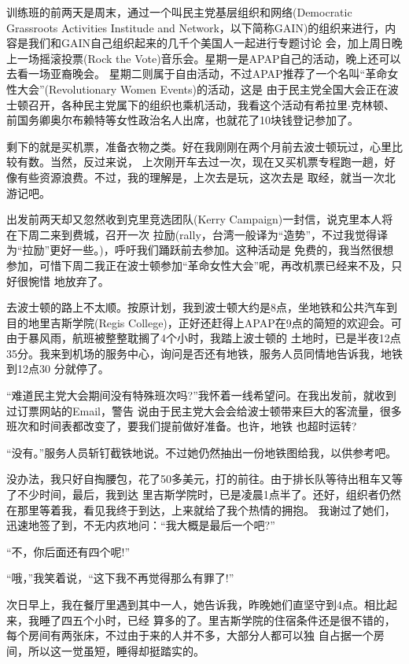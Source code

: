 ﻿\documentclass[11pt]{article}
\begin{document}
训练班的前两天是周末，通过一个叫民主党基层组织和网络(Democratic Grassroots Activities Institude
and Network，以下简称GAIN)的组织来进行，内容是我们和GAIN自己组织起来的几千个美国人一起进行专题讨论
会，加上周日晚上一场摇滚投票(Rock the Vote)音乐会。星期一是APAP自己的活动，晚上还可以去看一场亚裔晚会。
星期二则属于自由活动，不过APAP推荐了一个名叫``革命女性大会''(Revolutionary Women Events)的活动，这是
由于民主党全国大会正在波士顿召开，各种民主党属下的组织也乘机活动，我看这个活动有希拉里$\cdot$克林顿、
前国务卿奥尔布赖特等女性政治名人出席，也就花了10块钱登记参加了。

剩下的就是买机票，准备衣物之类。好在我刚刚在两个月前去波士顿玩过，心里比较有数。当然，反过来说，
上次刚开车去过一次，现在又买机票专程跑一趟，好像有些资源浪费。不过，我的理解是，上次去是玩，这次去是
取经，就当一次北游记吧。

出发前两天却又忽然收到克里竞选团队(Kerry Campaign)一封信，说克里本人将在下周二来到费城，召开一次
拉励(rally，台湾一般译为``造势''，不过我觉得译为``拉励''更好一些。)，呼吁我们踊跃前去参加。这种活动是
免费的，我当然很想参加，可惜下周二我正在波士顿参加``革命女性大会''呢，再改机票已经来不及，只好很惋惜
地放弃了。

去波士顿的路上不太顺。按原计划，我到波士顿大约是8点，坐地铁和公共汽车到目的地里吉斯学院(Regis
College)，正好还赶得上APAP在9点的简短的欢迎会。可由于暴风雨，航班被整整耽搁了4个小时，我踏上波士顿的
土地时，已是半夜12点35分。我来到机场的服务中心，询问是否还有地铁，服务人员同情地告诉我，地铁到12点30
分就停了。

``难道民主党大会期间没有特殊班次吗?''我怀着一线希望问。在我出发前，就收到过订票网站的Email，警告
说由于民主党大会会给波士顿带来巨大的客流量，很多班次和时间表都改变了，要我们提前做好准备。也许，地铁
也超时运转?

``没有。''服务人员斩钉截铁地说。不过她仍然抽出一份地铁图给我，以供参考吧。

没办法，我只好自掏腰包，花了50多美元，打的前往。由于排长队等待出租车又等了不少时间，最后，我到达
里吉斯学院时，已是凌晨1点半了。还好，组织者仍然在那里等着我，看见我终于到达，上来就给了我个热情的拥抱。
我谢过了她们，迅速地签了到，不无内疚地问：``我大概是最后一个吧?''

``不，你后面还有四个呢!''

``哦，''我笑着说，``这下我不再觉得那么有罪了!''

次日早上，我在餐厅里遇到其中一人，她告诉我，昨晚她们直坚守到4点。相比起来，我睡了四五个小时，已经
算多的了。里吉斯学院的住宿条件还是很不错的，每个房间有两张床，不过由于来的人并不多，大部分人都可以独
自占据一个房间，所以这一觉虽短，睡得却挺踏实的。
\end{document}
